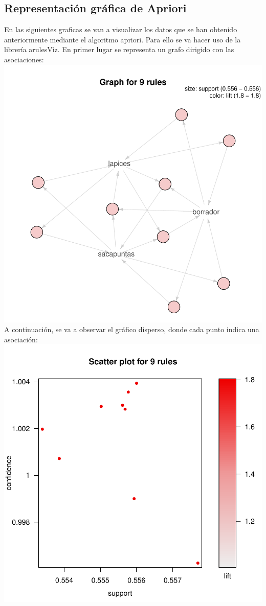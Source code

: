\documentclass [a4paper] {article}
\begin{document}
\subsection{Representación gráfica de Apriori}
En las siguientes graficas se van a visualizar los datos que se han obtenido
anteriormente mediante el algoritmo apriori.
Para ello se va hacer uso de la librería arulesViz.
En primer lugar se representa un grafo dirigido con las asociaciones:
\newline
\includegraphics{Memoria-Figura 13}
\newline
A continuación, se va a observar el gráfico disperso,
donde cada punto indica una asociación:
\newline
\includegraphics{Memoria-Figura 14}
\newline
\end{document}
